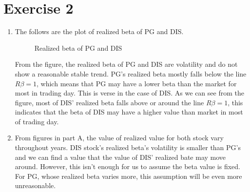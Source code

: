 \documentclass[12pt,letterpaper]{article}
\begin{document}
\section*{Exercise 2}
  \begin{enumerate}[label=\textbf{(\Alph*)}]
\item The follows are the plot of realized beta of PG and DIS.
\begin{figure}[H]
            \centering
            \caption{Realized beta of PG and DIS}
\end{figure}

From the figure, the realized beta of PG and DIS are volatility and do not show a reasonable stable trend. PG's realized beta mostly falls below the line $R\beta=1$, which means that PG may have a lower beta than the market for most in trading day. This is verse in the case of DIS. As we can see from the figure, most of DIS' realized beta falls above or around the line $R\beta=1$, this indicates that the beta of DIS may have a higher value than market in most of trading day.\\

\item From figures in part A, the value of realized value for both stock vary throughout years. DIS stock's realized beta's volatility is smaller than PG's and we can find a value that the value of DIS' realized bate may move around. However, this isn't enough for us to assume the beta value is fixed. For PG, whose realized beta varies more, this assumption will be even more unreasonable.\\


\end{enumerate}
\end{document}
